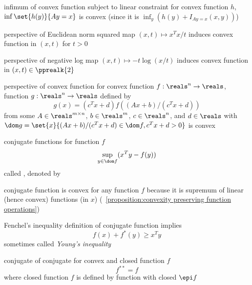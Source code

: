 \documentclass[17pt,landscape]{foils}
\begin{document}
{\item
	infimum of convex function
	subject to linear constraint
	\bit
	\iitem
		for convex function $h$,
		$\inf\set{h(y)}{Ay=x}$ is convex
		(since it is $\inf_y (h(y) + I_{Ay=x}(x,y))$)
	\eit

\item
	perspective of Euclidean norm squared
	\bit
	\iitem
		map $(x,t) \mapsto x^Tx /t$
		induces convex function in $(x,t)$ for $t>0$
	\eit

\item
	perspective of negative log
	\bit
	\iitem
		map $(x,t) \mapsto -t \log(x/t)$
		induces convex function in $(x,t) \in \pprealk{2}$
	\eit
\eit

\myfoilhead{}

\bit
\item
	perspective of convex function
	\bit
	\iitem
		for convex function $f:\reals^n\to\reals$,
		function $g:\reals^n\to\reals$
		defined by
		$$
			g(x) = (c^T x + d) f((Ax+b)/(c^T x + d))
		$$
		from some $A\in\reals^{m\times n}$, $b\in\reals^m$, $c\in\reals^n$, and $d\in\reals$
		with $\dom g = \set{x}{(Ax+b)/(c^Tx + d)\in \dom f, c^T x + d >0}$
		is convex
	\eit
\eit



\begin{mydefinition}{conjugate functions}
	for function $f$
	$$
		\sup_{y\in \dom f} (x^Ty - f(y))
	$$
	called ,
	denoted by 
\end{mydefinition}

\shrinkspacewithintheoremslikehalf
\bit
\item
	conjugate function is convex for any function $f$
	because it is supremum
	of linear (hence convex) functions (in $x$)
	(\propositionname~\ref{proposition:convexity preserving function operations})
\eit

\begin{myinequality}{Fenchel's inequality}
	definition of conjugate function implies
	$$
		f(x) + f^\ast(y) \geq x^Ty
	$$
	sometimes called \emph{Young's inequality}
\end{myinequality}

\begin{myproposition}{conjugate of conjugate}
	for convex and closed function $f$
	$$
		f^{\ast\ast} = f
	$$
	where closed function $f$ is defined by function with closed $\epi f$
\end{myproposition}


}
\end{document}
